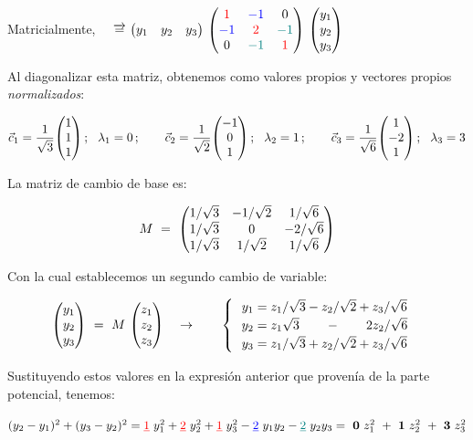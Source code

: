 Matricialmente, $\quad \overrightarrow{= } \ 
\mqty(y_1&y_2&y_3)\ \mqty ( \textcolor{red}{1}&\textcolor{blue}{-1}&0\\\textcolor{blue}{-1}&\textcolor{red}{2}&\textcolor{teal}{-1}\\0&\textcolor{teal}{-1}&\textcolor{red}{1})\ \mqty(y_1\\y_2\\y_3)$  

Al diagonalizar esta matriz, obtenemos como valores propios y vectores propios \emph{normalizados}:


$$\vec c_1=\dfrac 1 {\sqrt{3}} \mqty(1\\1\\1) \,; \ \ \lambda_1=0\,; \qquad
\vec c_2=\dfrac 1 {\sqrt{2}} \mqty(-1\\0\\1) \,; \ \ \lambda_2=1\,; \qquad
\vec c_3=\dfrac 1 {\sqrt{6}} \mqty(1\\-2\\1) \,; \ \ \lambda_3=3$$

La matriz de cambio de base es:

\begin{equation}
\label{T6matrizcambiobase.ortogonal}	
M\ = \ \mqty(1/\sqrt{3} & -1/\sqrt{2} & 1/\sqrt{6} \\ 1/\sqrt{3} & 0 & -2/\sqrt{6} \\ 1/\sqrt{3} & 1/\sqrt{2} & 1/\sqrt{6})
\end{equation} 

Con la cual establecemos un segundo cambio de variable:

\begin{equation}
\label{T6VC2}
\mqty(y_1\\y_2\\y_3) \ = \ M\ \mqty(z_1\\z_2\\z_3) \quad \to \qquad
\begin{cases}
\ \ y_1=z_1/\sqrt{3} - z_2/\sqrt{2}+z_3/\sqrt{6}\\
\ \ y_2=z_1\sqrt{3}\quad \quad - \quad \quad 2z_2/\sqrt{6}\\
\ \ y_3=z_1/\sqrt{3}+z_2/\sqrt{2}+z_3/\sqrt{6}	
\end{cases}	
\end{equation}


Sustituyendo estos valores en la expresión anterior que provenía de la parte potencial, tenemos:

$\begin{small} (y_2-y_1)^2  +  (y_3-y_2)^2 =
\textcolor{red}{\underline{1}} \ y_1^2 + \textcolor{red}{\underline{2}} \ y_2^2 +\textcolor{red}{\underline{1}} \ y_3^2-\textcolor{blue}{\underline{2}} \ y_1y_2-\textcolor{teal}{\underline{2}} \ y_2y_3 \end{small} =
\ \boldsymbol{0}\ z_1^2 \ + \ \boldsymbol{1} \ z_2^2 \ + \ \boldsymbol{3} \ z_3^2$

